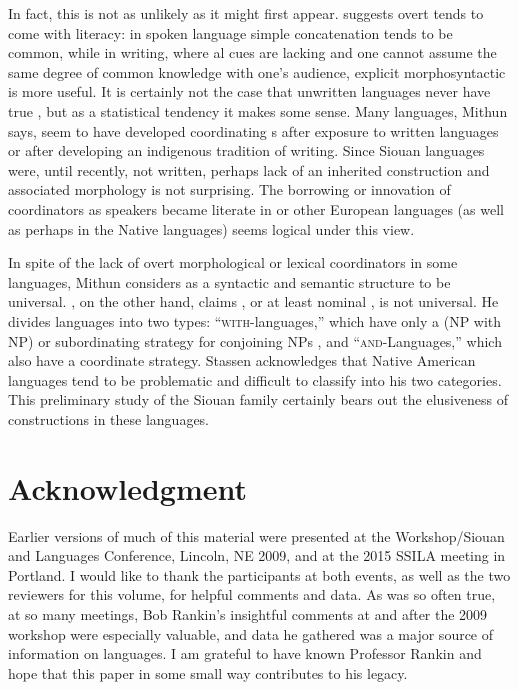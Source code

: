 \documentclass[output=paper]{LSP/langsci}
\begin{document}
In fact, this is not as unlikely as it might first appear. \citet{Mithun1988} suggests overt  tends to come with literacy: in spoken language simple concatenation tends to be common, while in writing, where al cues are lacking and one cannot assume the same degree of common knowledge with one's audience, explicit morphosyntactic  is more useful. It is certainly not the case that unwritten languages never have true , but as a statistical tendency it makes some sense. Many languages, Mithun says, seem to have developed coordinating s after exposure to written languages or after developing an indigenous tradition of writing. Since Siouan languages were, until recently, not written, perhaps lack of an inherited  construction and associated morphology is not surprising. The borrowing or innovation of coordinators as speakers became literate in  or other European languages (as well as perhaps in the Native languages) seems logical under this view.

In spite of the lack of overt morphological or lexical coordinators in some languages, Mithun considers  as a syntactic and semantic structure to be universal. \citet{Stassen2000}, on the other hand, claims , or at least nominal , is not universal. He divides languages into two types: ``\textsc{with}-languages,'' which have only a  (NP with NP) or subordinating strategy for conjoining NPs , and ``\textsc{and}-Languages,'' which also have a coordinate strategy. Stassen acknowledges that Native American languages tend to be problematic and difficult to classify into his two categories. This preliminary study of the Siouan family certainly bears out the elusiveness of  constructions in these languages.

\section*{Acknowledgment}

Earlier versions of much of this material were presented at the  Workshop/Siouan and  Languages Conference, Lincoln, NE 2009, and at the 2015 SSILA meeting in Portland. I would like to thank the participants at both events, as well as the two reviewers for this volume, for helpful comments and data. As was so often true, at so many meetings, Bob Rankin's insightful comments at and after the 2009 workshop were especially valuable, and data he gathered was a major source of information on  languages. I am grateful to have known Professor Rankin and hope that this paper in some small way contributes to his legacy.
\end{document}

